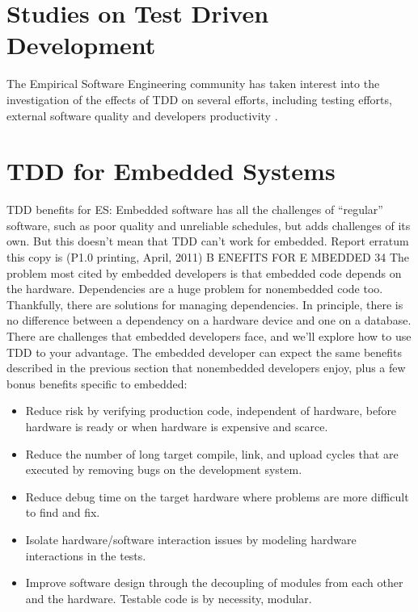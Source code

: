 \section{Studies on Test Driven Development}
The Empirical Software Engineering community has taken interest into the investigation of the effects of TDD on several efforts, including testing efforts, external software quality and developers productivity \cite{DBLP:conf/esem/FucciS0SSUTJO16}.



\section{TDD for Embedded Systems}
TDD benefits for ES:
Embedded software has all the challenges of “regular” software, such as
poor quality and unreliable schedules, but adds challenges of its own.
But this doesn’t mean that TDD can’t work for embedded.
Report erratum
this copy is (P1.0 printing, April, 2011)
B ENEFITS FOR E MBEDDED 34
The problem most cited by embedded developers is that embedded
code depends on the hardware. Dependencies are a huge problem for
nonembedded code too. Thankfully, there are solutions for managing
dependencies. In principle, there is no difference between a dependency
on a hardware device and one on a database.
There are challenges that embedded developers face, and we’ll explore
how to use TDD to your advantage. The embedded developer can expect
the same benefits described in the previous section that nonembedded
developers enjoy, plus a few bonus benefits specific to embedded:
\begin{itemize}
    \item Reduce risk by verifying production code, independent of hardware, before hardware is ready or when hardware is expensive and scarce.
    \item Reduce the number of long target compile, link, and upload cycles that are executed by removing bugs on the development system.
    \item Reduce debug time on the target hardware where problems are more difficult to find and fix.
    \item Isolate hardware/software interaction issues by modeling hardware interactions in the tests.
    \item Improve software design through the decoupling of modules from each other and the hardware. Testable code is by necessity, modular.
\end{itemize}



